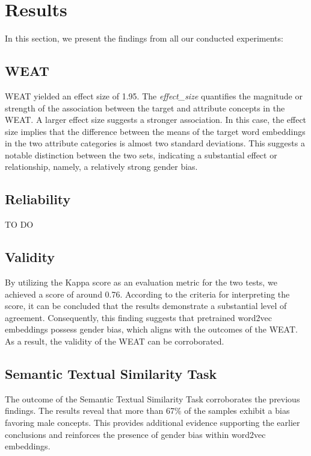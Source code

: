 \documentclass[11pt]{article}
\begin{document}
\section{Results}
In this section, we present the findings from all our conducted experiments:

\subsection{WEAT}
WEAT yielded an effect size of 1.95. The \textit{effect\_size} quantifies the magnitude or strength of the association between the target and attribute concepts in the WEAT. A larger effect size suggests a stronger association. In this case, the effect size implies that the difference between the means of the target word embeddings in the two attribute categories is almost two standard deviations. This suggests a notable distinction between the two sets, indicating a substantial effect or relationship, namely, a relatively strong gender bias.

\subsection{Reliability}
TO DO

\subsection{Validity}
By utilizing the Kappa score as an evaluation metric for the two tests, we achieved a score of around 0.76. According to the criteria for interpreting the score, it can be concluded that the results demonstrate a substantial level of agreement. Consequently, this finding suggests that pretrained word2vec embeddings possess gender bias, which aligns with the outcomes of the WEAT. As a result, the validity of the WEAT can be corroborated.

\subsection{Semantic Textual Similarity Task}
The outcome of the Semantic Textual Similarity Task corroborates the previous findings. The results reveal that more than 67\% of the samples exhibit a bias favoring male concepts. This provides additional evidence supporting the earlier conclusions and reinforces the presence of gender bias within word2vec embeddings.
\end{document}
